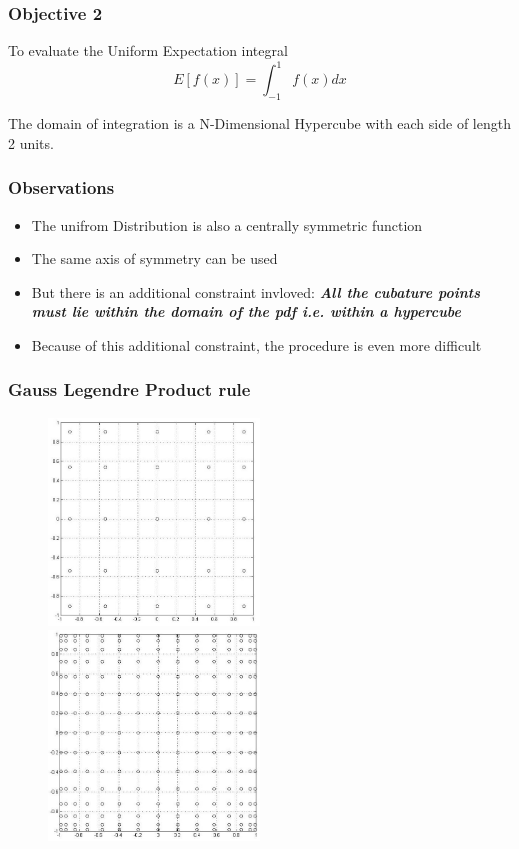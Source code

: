 \documentclass{beamer}
\begin{document}
\begin{frame}
\frametitle{Objective 2}
\begin{block}{To evaluate the Uniform Expectation integral}
\large
\begin{equation*}
E[f(x)]=\int_{-1}^{1}{f(x)}dx
\end{equation*}
\end{block}
\begin{block}{}
\large
The domain of integration is a N-Dimensional Hypercube with each side of length 2 units.
\end{block}
\end{frame}
\begin{frame}
\frametitle{Observations}
\begin{itemize}[<+->]
\item The unifrom Distribution is also a centrally symmetric function
\item The same axis of symmetry can be used
\item But there is an additional constraint invloved: {\bf \emph{All the cubature points must lie within the domain of the pdf i.e. within a hypercube}}
\item Because of this additional constraint, the procedure is even more difficult
\end{itemize}
\end{frame}
\begin{frame}
\frametitle{Gauss Legendre Product rule}
   \begin{figure}[thpb]
      \centering
      \includegraphics[width=0.5\textwidth]{gausslegendpic1.jpg}
      \includegraphics[width=0.5\textwidth]{gausslegendpic2.jpg}
      \label{fig:23d4m1}
   \end{figure} 
\end{frame}
\end{document}
